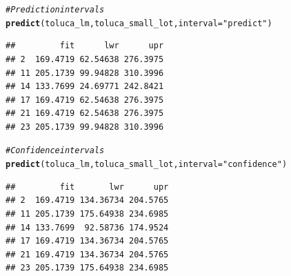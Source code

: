 \documentclass{article}\usepackage[]{graphicx}\usepackage[]{color}
\makeatletter
\newcommand{\hlstr}[1]{\textcolor[rgb]{0.192,0.494,0.8}{#1}}%
\newcommand{\hlcom}[1]{\textcolor[rgb]{0.678,0.584,0.686}{\textit{#1}}}%
\newcommand{\hlstd}[1]{\textcolor[rgb]{0.345,0.345,0.345}{#1}}%
\newcommand{\hlkwc}[1]{\textcolor[rgb]{0.333,0.667,0.333}{#1}}%
\newcommand{\hlkwd}[1]{\textcolor[rgb]{0.737,0.353,0.396}{\textbf{#1}}}%
\newenvironment{kframe}{%
 \def\at@end@of@kframe{}%
 \ifinner\ifhmode%
  \def\at@end@of@kframe{\end{minipage}}%
  \begin{minipage}{\columnwidth}%
 \fi\fi%
 \def\FrameCommand##1{\hskip\@totalleftmargin \hskip-\fboxsep
 \colorbox{shadecolor}{##1}\hskip-\fboxsep
     \hskip-\linewidth \hskip-\@totalleftmargin \hskip\columnwidth}%
 \MakeFramed {\advance\hsize-\width
   \@totalleftmargin\z@ \linewidth\hsize
   \@setminipage}}%
 {\par\unskip\endMakeFramed%
 \at@end@of@kframe}
\newenvironment{knitrout}{}{} %
\makeatother
\begin{document}
\begin{knitrout}
\begin{kframe}
\begin{alltt}
\hlcom{# Prediction intervals}
\hlkwd{predict}\hlstd{(toluca_lm, toluca_small_lot,} \hlkwc{interval} \hlstd{=} \hlstr{"predict"}\hlstd{)}
\end{alltt}
\begin{verbatim}
##         fit      lwr      upr
## 2  169.4719 62.54638 276.3975
## 11 205.1739 99.94828 310.3996
## 14 133.7699 24.69771 242.8421
## 17 169.4719 62.54638 276.3975
## 21 169.4719 62.54638 276.3975
## 23 205.1739 99.94828 310.3996
\end{verbatim}
\begin{alltt}
\hlcom{# Confidence intervals}
\hlkwd{predict}\hlstd{(toluca_lm, toluca_small_lot,} \hlkwc{interval} \hlstd{=} \hlstr{"confidence"}\hlstd{)}
\end{alltt}
\begin{verbatim}
##         fit       lwr      upr
## 2  169.4719 134.36734 204.5765
## 11 205.1739 175.64938 234.6985
## 14 133.7699  92.58736 174.9524
## 17 169.4719 134.36734 204.5765
## 21 169.4719 134.36734 204.5765
## 23 205.1739 175.64938 234.6985
\end{verbatim}
\end{kframe}
\end{knitrout}
\end{document}
